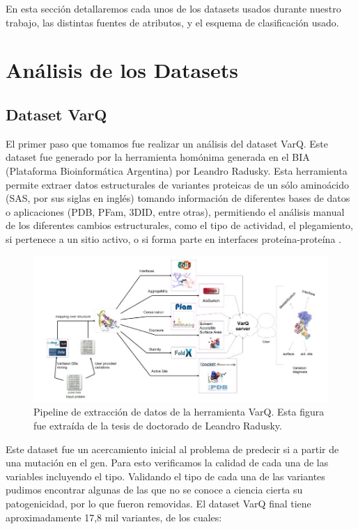 En esta sección detallaremos cada unos de los datasets usados durante nuestro trabajo, las distintas fuentes de atributos, y el esquema de clasificación usado.

\section{Análisis de los Datasets}

\subsection{Dataset VarQ}

El primer paso que tomamos fue realizar un análisis del dataset VarQ. Este dataset fue generado por la herramienta homónima generada en el BIA (Plataforma Bioinformática Argentina) por Leandro Radusky. Esta herramienta permite extraer datos estructurales de variantes proteicas de un sólo aminoácido (SAS, por sus siglas en inglés) tomando información de diferentes bases de datos o aplicaciones (PDB, PFam, 3DID, entre otras), permitiendo el análisis manual de los diferentes cambios estructurales, como el tipo de actividad, el plegamiento, si pertenece a un sitio activo, o si forma parte en interfaces proteína-proteína \cite{Radusky2017}. 

\begin{figure}[H]
    \centering
    \includegraphics[scale=0.4]{documents/latex/figures/1/pipeline.png}
    \caption{Pipeline de extracción de datos de la herramienta VarQ. Esta figura fue extraída de la tesis de doctorado de Leandro Radusky.}
    \label{fig:varq_pipeline}
\end{figure}


Este dataset fue un acercamiento inicial al problema de predecir si a partir de una mutación en el gen. Para esto verificamos la calidad de cada una de las variables incluyendo el tipo. Validando el tipo de cada una de las variantes pudimos encontrar algunas de las que no se conoce a ciencia cierta su patogenicidad, por lo que fueron removidas. El dataset VarQ final tiene aproximadamente 17,8 mil variantes, de los cuales:

